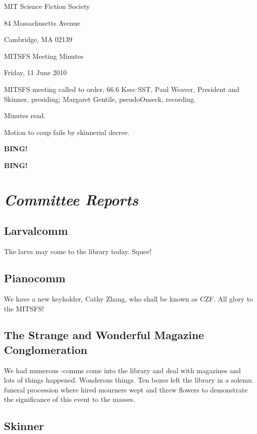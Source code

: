 \documentclass[10pt]{article}
\newcommand{\bing}{{\bf BING!} }
\newcommand{\goto}[1]{\bing \vskip 12pt \section*{{\em{#1}}}}
\newcommand{\skinner}{Paul Weaver, President and Skinner}
\newcommand{\onseck}{Margaret Gentile, pseudoOnseck}
\newcommand{\meetingdate}{Friday, 11 June 2010}
\begin{document}
\begin{center}

MIT Science Fiction Society

84 Massachusetts Avenue

Cambridge, MA 02139

\vspace{12pt}

MITSFS Meeting Minutes

\meetingdate

\end{center}

\vspace{18pt}

\setlength{\parskip}{6pt}

\noindent
MITSFS meeting called to order, 66.6 Ksec SST,
\skinner, presiding; \onseck, recording.

Minutes read.

Motion to coup fails by skinnerial decree.

\bing

\goto{Committee Reports}

\subsection*{Larvalcomm}

The larva may come to the library today.  Squee!

\subsection*{Pianocomm}

We have a new keyholder, Cathy Zhang, who shall be known as CZF.  
All glory to the MITSFS!

\subsection*{The Strange and Wonderful Magazine Conglomeration}

We had numerous -comms come into the library and deal with magazines
and lots of things happened. Wonderous things. Ten boxes left the
library in a solemn funeral procession where hired mourners wept
and threw flowers to demonstrate the significance of this event
to the masses.

\subsection*{Skinner}
\end{document}
